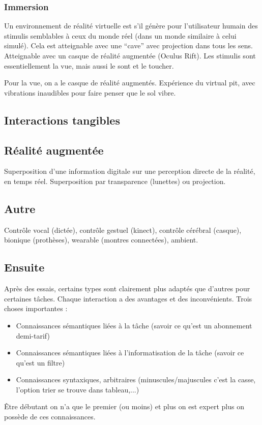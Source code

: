 \documentclass[12pt,a4paper]{article}
\begin{document}
\subsubsection{Immersion}
Un environnement de réalité virtuelle est s'il génère pour l'utilisateur humain des stimulis semblables à ceux du monde réel (dans un monde similaire à celui simulé). Cela est atteignable avec une ``cave'' avec projection dans tous les sens. Atteignable avec un casque de réalité augmentée (Oculus Rift). Les stimulis sont essentiellement la vue, mais aussi le sont et le toucher.

Pour la vue, on a le casque de réalité augmentés. Expérience du virtual pit, avec vibrations inaudibles pour faire penser que le sol vibre. 

\subsection{Interactions tangibles}

\subsection{Réalité augmentée}
Superposition d'une information digitale sur une perception directe de la réalité, en temps réel. Superposition par transparence (lunettes) ou projection. 	

\subsection{Autre}
Contrôle vocal (dictée), contrôle gestuel (kinect), contrôle cérébral (casque), bionique (prothèses), wearable (montres connectées), ambient.

\subsection{Ensuite}
Après des essais, certains types sont clairement plus adaptés que d'autres pour certaines tâches. Chaque interaction a des avantages et des inconvénients. Trois choses importantes :
\begin{itemize}
    \item     Connaissances sémantiques liées à la tâche (savoir ce qu'est un abonnement demi-tarif)
    \item     Connaissances sémantiques liées à l'informatisation de la tâche (savoir ce qu'est un filtre)
    \item     Connaissances syntaxiques, arbitraires (minuscules/majuscules c'est la casse, l'option trier se trouve dans tableau,...)
\end{itemize}
Être débutant on n'a que le premier (ou moins) et plus on est expert plus on possède de ces connaissances.
\end{document}
